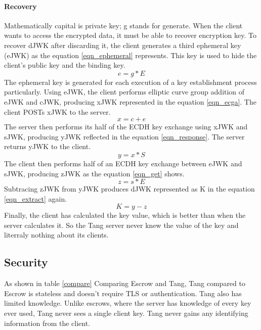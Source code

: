 \paragraph{Recovery}
Mathematically capital is private key; g stands for generate.
When the client wants to access the encrypted data, it must be able to recover encryption key.
To recover dJWK after discarding it, the client generates a third ephemeral key (eJWK) as the equation \ref{eqn_ephemeral} represents.
This key is used to hide the client's public key and the binding key.
\begin{equation}\label{eqn_ephemeral}
    e = g * E
\end{equation}
The ephemeral key is generated for each execution of a key establishment process particularly.
Using eJWK, the client performs elliptic curve group addition of eJWK and cJWK, producing xJWK represented in the equation \ref{eqn_ecga}.
The client POSTs xJWK to the server.
\begin{equation}\label{eqn_ecga}
    x = c + e
\end{equation}
The server then performs its half of the ECDH key exchange using xJWK and sJWK, producing yJWK reflected in the equation \ref{eqn_response}. The server returns yJWK to the client.
\begin{equation}\label{eqn_response}
    y = x * S
\end{equation}
The client then performs half of an ECDH key exchange between eJWK and sJWK, producing zJWK as the equation \ref{eqn_get} shows.
\begin{equation}\label{eqn_get}
    z = s * E
\end{equation}
Subtracing zJWK from yJWK produces dJWK represented as K in the equation \ref{eqn_extract} again.
\begin{equation}\label{eqn_extract}
    K = y - z
\end{equation}
Finally, the client has calculated the key value, which is better than when the server calculates it.
So the Tang server never knew the value of the key and literraly nothing about its clients.



\subsection{Security}

As shown in table \ref{compare} Comparing Escrow and Tang, Tang compared to Escrow is stateless and doesn't require TLS or authentication. %
Tang also has limited knowledge.
Unlike escrows, where the server has knowledge of every key ever used, Tang never sees a single client key.
Tang never gains any identifying information from the client.

